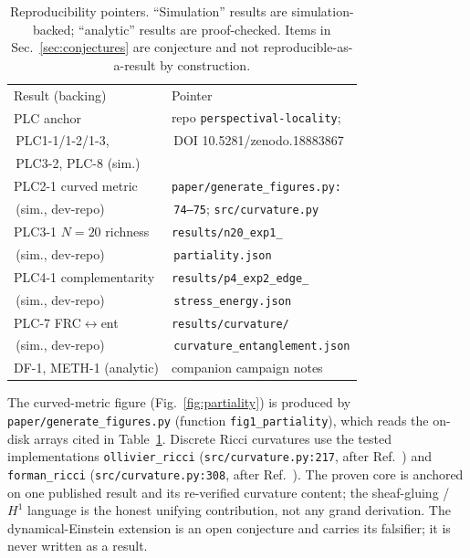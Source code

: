 \documentclass[aps,pra,twocolumn,superscriptaddress,floatfix]{revtex4-2}
\theoremstyle{definition}
\begin{document}
\begin{table}[h]
\caption{Reproducibility pointers. ``Simulation'' results are
simulation-backed; ``analytic'' results are proof-checked. Items in
Sec.~\ref{sec:conjectures} are conjecture and not reproducible-as-a-result by
construction.}
\label{tab:repro}
\begin{ruledtabular}
\begin{tabular}{ll}
Result (backing) & Pointer \\
\colrule
PLC anchor & repo \texttt{perspectival-locality}; \\
\,PLC1-1/1-2/1-3, & \,DOI 10.5281/zenodo.18883867 \\
\,PLC3-2, PLC-8 (sim.) & \\
PLC2-1 curved metric & \texttt{paper/generate\_figures.py:} \\
\,(sim., dev-repo) & \,\texttt{74--75}; \texttt{src/curvature.py} \\
PLC3-1 $N=20$ richness & \texttt{results/n20\_exp1\_} \\
\,(sim., dev-repo) & \,\texttt{partiality.json} \\
PLC4-1 complementarity & \texttt{results/p4\_exp2\_edge\_} \\
\,(sim., dev-repo) & \,\texttt{stress\_energy.json} \\
PLC-7 FRC$\leftrightarrow$ent & \texttt{results/curvature/} \\
\,(sim., dev-repo) & \,\texttt{curvature\_entanglement.json} \\
DF-1, METH-1 (analytic) & companion campaign notes \\
\end{tabular}
\end{ruledtabular}
\end{table}

The curved-metric figure (Fig.~\ref{fig:partiality}) is produced by
\texttt{paper/generate\_figures.py} (function \texttt{fig1\_partiality}), which
reads the on-disk arrays cited in Table~\ref{tab:repro}. Discrete Ricci
curvatures use the tested implementations \texttt{ollivier\_ricci}
(\texttt{src/curvature.py:217}, after Ref.~\cite{ollivier2009}) and
\texttt{forman\_ricci} (\texttt{src/curvature.py:308}, after
Ref.~\cite{forman2003}). The proven core is anchored on one published result and
its re-verified curvature content; the sheaf-gluing / $H^1$ language is the
honest unifying contribution, not any grand derivation. The dynamical-Einstein
extension is an open conjecture and carries its falsifier; it is never written as
a result.
\end{document}
